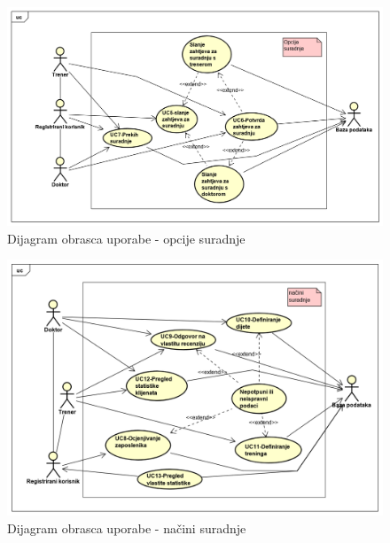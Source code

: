 					\begin{figure}[H]
						\includegraphics[scale=0.50]{dijagrami/UseCase/UseCase Diagram2.PNG}
						\centering
						\caption{Dijagram obrasca uporabe - opcije suradnje}
						\label{fig:promjene}
					\end{figure}
				
					\begin{figure}[H]
						\includegraphics[scale=0.50]{dijagrami/UseCase/UseCase Diagram3.PNG}
						\centering
						\caption{Dijagram obrasca uporabe - načini suradnje}
						\label{fig:promjene}
					\end{figure}
				
